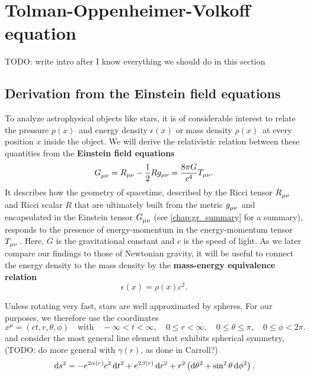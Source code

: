 \chapter{Tolman-Oppenheimer-Volkoff equation}

TODO: write intro after I know everything we should do in this section

\section{Derivation from the Einstein field equations}
\label{sec:einstein_to_tov}

To analyze astrophysical objects like stars, it is of considerable interest to relate the pressure $p(x)$ and energy density $\epsilon(x)$ or mass density $\rho(x)$ at every position $x$ inside the object.
We will derive the relativistic relation between these quantities from the \textbf{Einstein field equations} \cite[equation 4.44]{ref:carroll}
\begin{equation}
	G\indices{_\mu_\nu} = R_{\mu \nu} - \frac{1}{2} R g_{\mu \nu} = \frac{8 \pi G}{c^4} T_{\mu \nu} .
	\label{eq:einstein}
\end{equation}
It describes how the geometry of spacetime, described by the Ricci tensor $R\indices{_\mu_\nu}$ and Ricci scalar $R$ that are ultimately built from the metric $g\indices{_\mu_\nu}$ and encapsulated in the Einstein tensor $G\indices{_\mu_\nu}$ (see \cref{chap:gr_summary} for a summary), responds to the presence of energy-momentum in the energy-momentum tensor $T\indices{_\mu_\nu}$.
Here, $G$ is the gravitational constant and $c$ is the speed of light.
As we later compare our findings to those of Newtonian gravity, it will be useful to connect the energy density to the mass density by the \textbf{mass-energy equivalence relation}
\begin{equation}
	\epsilon(x) = \rho(x) c^2 .
	\label{eq:tov:mass_energy_equivalence}
\end{equation}

Unless rotating very fast, stars are well approximated by spheres.
For our purposes, we therefore use the coordinates
\begin{equation}
	x^\mu = (c t, r, \theta, \phi)
	\quad \text{with} \quad
	-\infty < t < \infty, \quad
	0 \leq r < \infty, \quad
	0 \leq \theta \leq \pi, \quad
	0 \leq \phi < 2 \pi .
\end{equation}
and consider the most general line element that exhibits spherical symmetry, \cite[§ 94-95]{ref:tolman}
(TODO: do more general with $\gamma(r)$, as done in Carroll?)
\begin{equation}
	\mathop{}\!\mathrm{d} s^2 = -e^{2 \alpha(r)} c^2 \mathop{}\!\mathrm{d} t^2 + e^{2 \beta(r)} \mathop{}\!\mathrm{d} r^2 + r^2 \left( \mathop{}\!\mathrm{d} \theta^2 + \sin^2 \theta \mathop{}\!\mathrm{d} \phi^2 \right) .
\end{equation}

